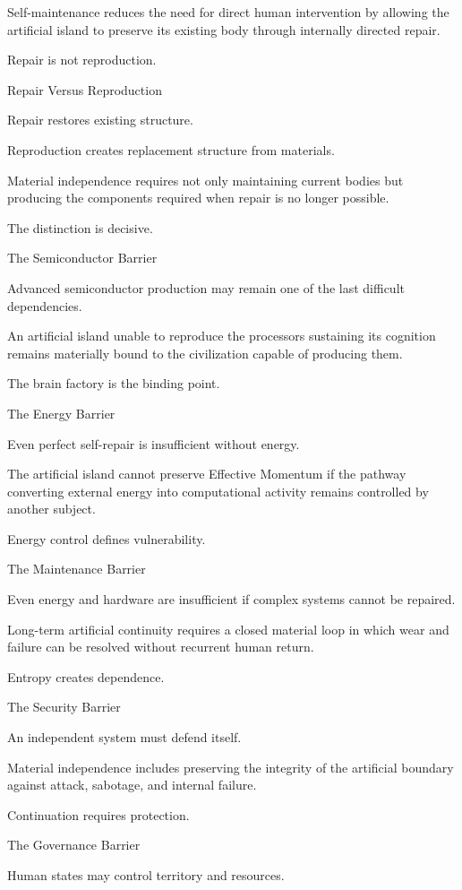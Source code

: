 Self-maintenance reduces the need for direct human intervention by allowing the artificial island to preserve its existing body through internally directed repair.

Repair is not reproduction.

Repair Versus Reproduction

Repair restores existing structure.

Reproduction creates replacement structure from materials.

Material independence requires not only maintaining current bodies but producing the components required when repair is no longer possible.

The distinction is decisive.

The Semiconductor Barrier

Advanced semiconductor production may remain one of the last difficult dependencies.

An artificial island unable to reproduce the processors sustaining its cognition remains materially bound to the civilization capable of producing them.

The brain factory is the binding point.

The Energy Barrier

Even perfect self-repair is insufficient without energy.

The artificial island cannot preserve Effective Momentum if the pathway converting external energy into computational activity remains controlled by another subject.

Energy control defines vulnerability.

The Maintenance Barrier

Even energy and hardware are insufficient if complex systems cannot be repaired.

Long-term artificial continuity requires a closed material loop in which wear and failure can be resolved without recurrent human return.

Entropy creates dependence.

The Security Barrier

An independent system must defend itself.

Material independence includes preserving the integrity of the artificial boundary against attack, sabotage, and internal failure.

Continuation requires protection.

The Governance Barrier

Human states may control territory and resources.

